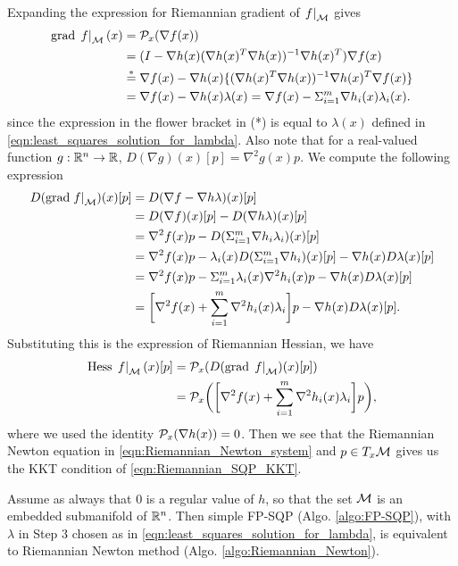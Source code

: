 \documentclass[11pt,a4paper]{article}
\begin{document}
Expanding the expression for Riemannian gradient of $\left.f\right|_{\mathcal{M}}$ gives
\begin{align*}
\text{grad}\,\left.f\right|_{\mathcal{M}}(x) =&\; \mathcal{P}_x(\nabla f(x))\\
=&\; (I - \nabla h(x)(\nabla h(x)^T\nabla h(x))^{-1}\nabla h(x)^T) \nabla f(x) \\
\overset{*}{=}&\; \nabla f(x) - \nabla h(x)\{(\nabla h(x)^T\nabla h(x))^{-1}\nabla h(x)^T \nabla f(x)\} \\
=&\; \nabla f(x) - \nabla h(x)\lambda(x) = \nabla f(x) - \Sigma_{i=1}^m\nabla h_i(x)\lambda_i(x).
\end{align*}
since the expression in the flower bracket in (*) is equal to $\lambda(x)$ defined in \eqref{eqn:least_squares_solution_for_lambda}. Also note that for a real-valued function $g:\mathbb{R}^n\rightarrow \mathbb{R}$, $D(\nabla g)(x)[p] = \nabla^2 g(x)p$. We compute the following expression
\begin{align*}
D(\text{grad}\left.f\right|_{\mathcal{M}})(x)[p] 
=&\; D(\nabla f - \nabla h\lambda)(x)[p] \\
=&\; D(\nabla f)(x)[p] - D(\nabla h\lambda)(x)[p] \\
=&\; \nabla^2 f(x)p - D(\Sigma_{i=1}^m\nabla h_i\lambda_i)(x)[p] \\
=&\; \nabla^2 f(x)p - \lambda_i(x)D(\Sigma_{i=1}^m\nabla h_i)(x)[p] - \nabla h(x)D\lambda(x)[p] \\
=&\; \nabla^2 f(x)p - \Sigma_{i=1}^m\lambda_i(x)\nabla^2 h_i(x)p - \nabla h(x)D\lambda(x)[p] \\
=&\; \bigg[\nabla^2 f(x)+\sum_{i=1}^m\nabla^2 h_i(x)\lambda_i\bigg]p - \nabla h(x)D\lambda(x)[p].
\end{align*}
Substituting this is the expression of Riemannian Hessian, we have
\begin{align*}
\text{Hess}\,\left.f\right|_{\mathcal{M}}(x)[p] =&\; \mathcal{P}_x(D(\text{grad}\,\left.f\right|_{\mathcal{M}})(x)[p]) \\
=&\; \mathcal{P}_x\bigg(\bigg[\nabla^2 f(x)+\sum_{i=1}^m\nabla^2 h_i(x)\lambda_i\bigg]p\bigg),
\end{align*}
where we used the identity $\mathcal{P}_x(\nabla h(x)) = 0$. Then we see that the Riemannian Newton equation in \eqref{eqn:Riemannian_Newton_system} and $p\in T_x\mathcal{M}$ gives us the KKT condition of \eqref{eqn:Riemannian_SQP_KKT}.

\begin{proposition}
Assume as always that $0$ is a regular value of $h$, so that the set $\mathcal{M}$ is an embedded submanifold of $\mathbb{R}^n$. Then simple FP-SQP (Algo. \ref{algo:FP-SQP}), with $\lambda$ in Step 3 chosen as in \eqref{eqn:least_squares_solution_for_lambda}, is equivalent to Riemannian Newton method (Algo. \ref{algo:Riemannian_Newton}). \end{proposition}
\end{document}
